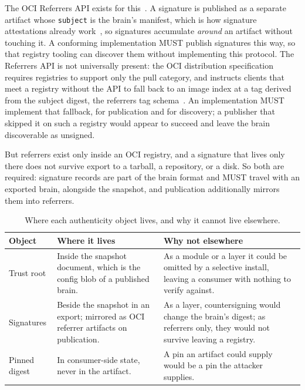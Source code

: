 \documentclass[11pt,a4paper]{article}
\begin{document}
The OCI Referrers API exists for this~\cite{oci_referrers}. A signature is
published as a separate artifact whose \texttt{subject} is the brain's manifest,
which is how signature attestations already
work~\cite{newman2022sigstore, torres2019intoto}, so signatures accumulate
\emph{around} an artifact without touching it. A conforming implementation MUST publish signatures this way, so that registry
tooling can discover them without implementing this protocol. The Referrers
API is not universally present: the OCI distribution specification requires
registries to support only the pull category, and instructs clients that meet
a registry without the API to fall back to an image index at a tag derived
from the subject digest, the referrers tag schema~\cite{oci_referrers}. An
implementation MUST implement that fallback, for publication and for
discovery; a publisher that skipped it on such a registry would appear to
succeed and leave the brain discoverable as unsigned.

But referrers exist only inside an OCI registry, and a signature that lives
only there does not survive export to a tarball, a repository, or a disk. So
both are required: signature records are part of the brain format and MUST
travel with an exported brain, alongside the snapshot, and publication
additionally mirrors them into referrers.

\begin{table}[htbp]
\centering
\caption{Where each authenticity object lives, and why it cannot live elsewhere.}
\label{tab:authloc}
\begin{tabularx}{\textwidth}{lYY}
\toprule
\textbf{Object} & \textbf{Where it lives} & \textbf{Why not elsewhere} \\
\midrule
Trust root  & Inside the snapshot document, which is the config blob of a
  published brain. &
  As a module or a layer it could be omitted by a selective install, leaving a
  consumer with nothing to verify against. \\
Signatures  & Beside the snapshot in an export; mirrored as OCI referrer
  artifacts on publication. &
  As a layer, countersigning would change the brain's digest; as referrers only,
  they would not survive leaving a registry. \\
Pinned digest & In consumer-side state, never in the artifact. &
  A pin an artifact could supply would be a pin the attacker supplies. \\
\bottomrule
\end{tabularx}
\end{table}
\end{document}
